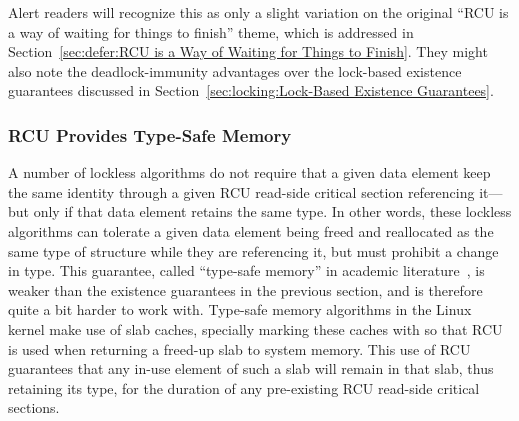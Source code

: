 Alert readers will recognize this as only a slight variation on
the original ``RCU is a way of waiting for things to finish'' theme,
which is addressed in
Section~\ref{sec:defer:RCU is a Way of Waiting for Things to Finish}.
They might also note the deadlock-immunity advantages over the lock-based
existence guarantees discussed in
Section~\ref{sec:locking:Lock-Based Existence Guarantees}.

\subsubsection{RCU Provides Type-Safe Memory}
\label{sec:defer:RCU Provides Type-Safe Memory}

A number of lockless algorithms do not require that a given data
element keep the same identity through a given RCU read-side critical
section referencing it---but only if that data element retains the
same type.
In other words, these lockless algorithms can tolerate a given data
element being freed and reallocated as the same type of structure
while they are referencing it, but must prohibit a change in type.
This guarantee, called ``type-safe memory'' in
academic literature~\cite{Cheriton96a},
is weaker than the existence guarantees in the
previous section, and is therefore quite a bit harder to work with.
Type-safe memory algorithms in the Linux kernel make use of slab caches,
specially marking these caches with 
so that RCU is used when returning a freed-up
slab to system memory.
This use of RCU guarantees that any in-use element of
such a slab will remain in that slab, thus retaining its type,
for the duration of any pre-existing RCU read-side critical sections.

\QuickQuizEnd

